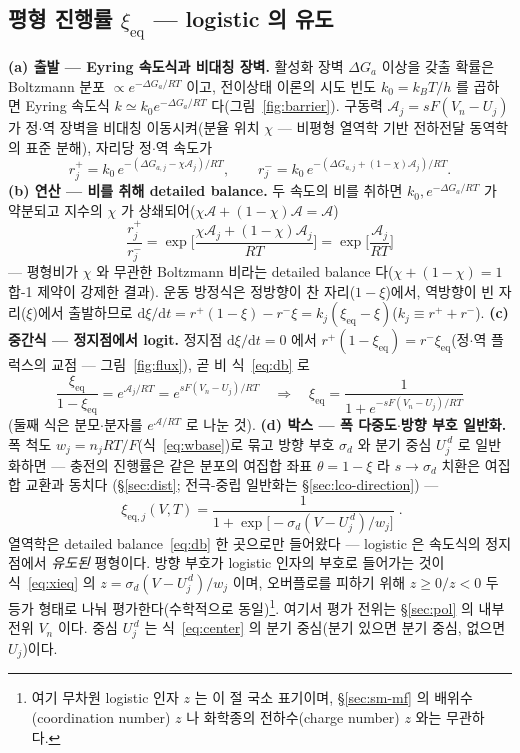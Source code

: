 \documentclass[11pt,a4paper]{article}
\newcommand{\dd}{\mathrm{d}}
\newcommand{\eq}{\mathrm{eq}}
\begin{document}
\subsection{평형 진행률 $\xi_\eq$ — logistic 의 유도}
\textbf{(a) 출발 — Eyring 속도식과 비대칭 장벽.} 활성화 장벽 $\Delta G_a$ 이상을 갖출 확률은 Boltzmann 분포
$\propto e^{-\Delta G_a/RT}$ 이고, 전이상태 이론의 시도 빈도 $k_0=k_BT/h$ 를 곱하면 Eyring 속도식
$k\simeq k_0e^{-\Delta G_a/RT}$ 다(그림~\ref{fig:barrier})\cite{eyring1935}. 구동력 $\mathcal A_j=sF(V_n-U_j)$ 가 정$\cdot$역 장벽을
비대칭 이동시켜(분율 위치 $\chi$ — 비평형 열역학 기반 전하전달 동역학의 표준 분해\cite{bazant2013}), 자리당 정$\cdot$역 속도가
\begin{equation}
r_j^+=k_0\,e^{-(\Delta G_{a,j}-\chi\mathcal A_j)/RT},\qquad
r_j^-=k_0\,e^{-(\Delta G_{a,j}+(1-\chi)\mathcal A_j)/RT}.
\label{eq:bv}
\end{equation}
\textbf{(b) 연산 — 비를 취해 detailed balance.} 두 속도의 비를 취하면 $k_0,e^{-\Delta G_a/RT}$ 가 약분되고 지수의
$\chi$ 가 상쇄되어($\chi\mathcal A+(1-\chi)\mathcal A=\mathcal A$)
\begin{equation}
\frac{r_j^+}{r_j^-}=\exp\!\Big[\frac{\chi\mathcal A_j+(1-\chi)\mathcal A_j}{RT}\Big]=\exp\!\Big[\frac{\mathcal A_j}{RT}\Big]
\label{eq:db}
\end{equation}
— 평형비가 $\chi$ 와 무관한 Boltzmann 비라는 detailed balance 다($\chi+(1-\chi)=1$ 합-1 제약이 강제한 결과). 운동
방정식은 정방향이 찬 자리($1-\xi$)에서, 역방향이 빈 자리($\xi$)에서 출발하므로
$\dd\xi/\dd t=r^+(1-\xi)-r^-\xi=k_j(\xi_\eq-\xi)$($k_j\equiv r^++r^-$). \textbf{(c) 중간식 — 정지점에서 logit.}
정지점 $\dd\xi/\dd t=0$ 에서 $r^+(1-\xi_\eq)=r^-\xi_\eq$(정$\cdot$역 플럭스의 교점 — 그림~\ref{fig:flux}), 곧
비 식~\eqref{eq:db} 로
\begin{equation}
\frac{\xi_\eq}{1-\xi_\eq}=e^{\mathcal A_j/RT}=e^{sF(V_n-U_j)/RT}
\quad\Longrightarrow\quad
\xi_\eq=\frac{1}{1+e^{-sF(V_n-U_j)/RT}}
\label{eq:logisticsolve}
\end{equation}
(둘째 식은 분모$\cdot$분자를 $e^{\mathcal A/RT}$ 로 나눈 것). \textbf{(d) 박스 — 폭 다중도$\cdot$방향 부호 일반화.}
폭 척도 $w_j=n_jRT/F$(식~\eqref{eq:wbase})로 묶고 방향 부호 $\sigma_d$ 와 분기 중심 $U_j^{\,d}$ 로 일반화하면
--- 충전의 진행률은 같은 분포의 여집합 좌표 $\theta=1-\xi$ 라 $s\to\sigma_d$ 치환은 여집합 교환과 동치다
(\S\ref{sec:dist}; 전극-중립 일반화는 \S\ref{sec:lco-direction}) ---
\begin{equation}
\boxed{\;\xi_{\eq,j}(V,T)=\frac{1}{1+\exp\!\big[-\sigma_d(V-U_j^{\,d})/w_j\big]}\;.}
\label{eq:xieq}
\end{equation}
열역학은 detailed balance~\eqref{eq:db} 한 곳으로만 들어왔다 — logistic 은 속도식의 정지점에서 \emph{유도된}
평형이다. 방향 부호가 logistic 인자의 부호로 들어가는 것이 식~\eqref{eq:xieq} 의
$z=\sigma_d(V-U_j^{\,d})/w_j$ 이며, 오버플로를 피하기 위해 $z\ge0/z<0$ 두 등가 형태로 나눠 평가한다(수학적으로
동일)\footnote{여기 무차원 logistic 인자 $z$ 는 이 절 국소 표기이며, \S\ref{sec:sm-mf} 의 배위수(coordination
number) $z$ 나 화학종의 전하수(charge number) $z$ 와는 무관하다.}. 여기서 평가 전위는 \S\ref{sec:pol} 의 내부 전위 $V_n$ 이다. 중심 $U_j^{\,d}$
는 식~\eqref{eq:center} 의 분기 중심(분기 있으면 분기 중심, 없으면 $U_j$)이다.
\end{document}
